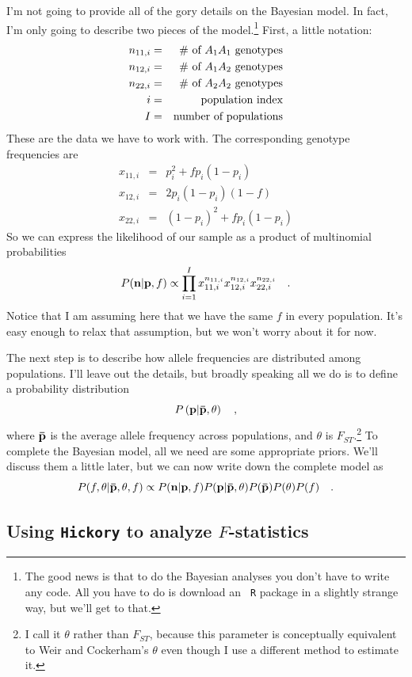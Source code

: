 \documentclass[12pt]{article}
\begin{document}
I'm not going to provide all of the gory details on the Bayesian
model. In fact, I'm only going to describe two pieces of the
model.\footnote{The good news is that to do the Bayesian analyses you
  don't have to write any code. All you have to do is download an {\tt
    R} package in a slightly strange way, but we'll get to that.}
First, a little notation:
\begin{eqnarray*}
n_{11,i} &=& \hbox{\# of $A_1A_1$ genotypes} \\
n_{12,i} &=& \hbox{\# of $A_1A_2$ genotypes} \\
n_{22,i} &=& \hbox{\# of $A_2A_2$ genotypes} \\
i         &=& \hbox{population index} \\
I         &=& \hbox{number of populations} \\
\end{eqnarray*}
These are the data we have to work with. The corresponding genotype
frequencies are
\begin{eqnarray*}
x_{11,i} &=& p_{i}^2 + fp_{i}(1-p_{i}) \\
x_{12,i} &=& 2p_{i}(1-p_{i})(1-f) \\
x_{22,i} &=& (1-p_{i})^2 + fp_{i}(1-p_{i})
\end{eqnarray*}
So we can express the likelihood of our sample as a product of
multinomial probabilities
\[
P({\bf n}|{\bf p},f) \propto \prod_{i=1}^I x_{11,i}^{n_{11,i}}
x_{12,i}^{n_{12,i}} x_{22,i}^{n_{22,i}} \quad .
\]
Notice that I am assuming here that we have the same $f$ in every
population. It's easy enough to relax that assumption, but we won't
worry about it for now.

The next step is to describe how allele frequencies are distributed
among populations. I'll leave out the details, but broadly speaking
all we do is to define a probability distribution
\[
P\left(\bf p|{\bf\bar p}, \theta\right) \quad ,
\]
where $\bf\bar p$ is the average allele frequency across populations,
and $\theta$ is $F_{ST}$.\footnote{I call it $\theta$ rather than
  $F_{ST}$, because this parameter is conceptually equivalent to Weir
  and Cockerham's $\theta$ even though I use a different method to
  estimate it.}
To complete the Bayesian model, all we need
are some appropriate priors. We'll discuss them a little
later, but we can now write down the complete model as
\[
P(f,\theta|{\bf\bar p},\theta,f) \propto
P({\bf n}|{\bf p},f) P({\bf p}|{\bf\bar p},\theta) P({\bf\bar
  p})P(\theta)P(f) \quad .
\]

\subsection*{Using {\tt Hickory} to analyze $F$-statistics}
\end{document}
